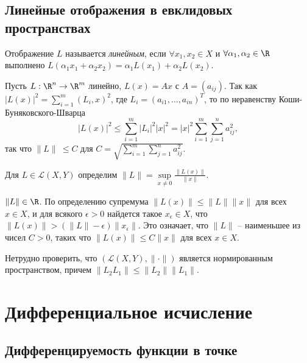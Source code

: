 
\subsection{Линейные отображения в евклидовых пространствах}

\begin{definition}
    Отображение $L$ называется \textit{линейным}, если $\forall x_{1}, x_{2} \in X$ и $\forall \alpha_{1}, \alpha_{2} \in \R$ выполнено $L(\alpha_{1}x_{1} + \alpha_{2}x_{2}) = \alpha_{1}L(x_{1}) + \alpha_{2}L(x_{2})$.
\end{definition}

\begin{example}
    Пусть $L: \R^{n} \to \R^{m}$ линейно, $L(x) = Ax$ с $A = (a_{ij})$. Так как $|L(x)|^{2} = \sum_{i = 1}^{m}(L_{i}, x)^{2}$, где $L_{i} = (a_{i1}, \ldots, a_{in})^{T}$, то по неравенству Коши-Буняковского-Шварца
    \[|L(x)|^{2} \leq \sum_{i = 1}^{m}|L_{i}|^{2}|x|^{2} = |x|^{2}\sum_{i = 1}^{m}\sum_{j = 1}^{n} a_{ij}^{2},\]
    так что $\|L\|\ \leq C$ для $C = \sqrt{\sum_{i = 1}^{m}\sum_{j = 1}^{n} a_{ij}^{2}}$.
\end{example}

\begin{definition}
    Для $L \in \mathcal{L}(X, Y)$ определим $\|L\| = \underset{x \neq 0}{\sup}\frac{\|L(x)\|}{\|x\|}$.
\end{definition}

\begin{note}
    $\|L\| \in \R$. По определению супремума $\|L(x)\| \leq \|L\|\|x\|$ для всех $x \in X$, и для всякого $\epsilon > 0$ найдется такое $x_{\epsilon} \in X$, что $\|L(x)\| > (\|L\| - \epsilon)\|x_{\epsilon}\|$. Это означает, что $\|L\|$ -- наименьшее из чисел $C > 0$, таких что $\|L(x)\| \leq C\|x\|$ для всех $x \in X$.

    Нетрудно проверить, что $(\mathcal{L}(X, Y), \|\cdot\|)$ является нормированным пространством, причем $\|L_{2}L_{1}\| \leq \|L_{2}\|\|L_{1}\|$.
\end{note}

\section{Дифференциальное исчисление}

\subsection{Дифференцируемость функции в точке}

